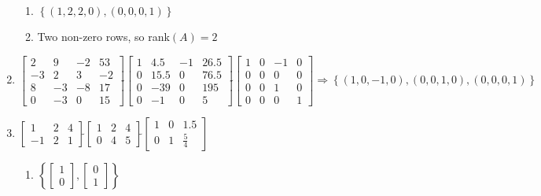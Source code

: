 \documentclass[12pt]{article}
\begin{document}
\begin{enumerate}
    \begin{enumerate}

      \item $\left\{ (1,2,2,0),(0,0,0,1) \right\}$

      \item Two non-zero rows, so rank$(A)=2$

    \end{enumerate}

    \setcounter{enumi}{16}

  \item $\begin{bmatrix} 2 & 9 & -2 & 53\\ -3 & 2 & 3 & -2\\ 8 & -3 & -8 & 17\\ 0 & -3 & 0 & 15 \end{bmatrix}\widetilde{ }\begin{bmatrix} 1 & 4.5 & -1 & 26.5\\ 0 & 15.5 & 0 & 76.5\\ 0 & -39 & 0 & 195\\ 0 & -1 & 0 & 5  \end{bmatrix}\widetilde{ }\begin{bmatrix}1 & 0 & -1 & 0\\ 0 & 0 & 0 & 0\\ 0 & 0 & 1 & 0\\ 0 & 0 & 0 & 1   \end{bmatrix}\Rightarrow\left\{ (1,0,-1,0),(0,0,1,0),(0,0,0,1) \right\}$

    \setcounter{enumi}{22}

  \item $\begin{bmatrix} 1 & 2 & 4\\ -1 & 2 & 1 \end{bmatrix}\widetilde{ }\begin{bmatrix} 1 & 2 & 4\\ 0 & 4 & 5 \end{bmatrix}\widetilde{ }\begin{bmatrix} 1 & 0 & 1.5\\ 0 & 1 & \frac{5}{4}  \end{bmatrix}$

        \begin{enumerate}

          \item $\left\{ \begin{bmatrix} 1\\0 \end{bmatrix},\begin{bmatrix} 0\\ 1\end{bmatrix} \right\}$


\end{enumerate}
\end{enumerate}
\end{document}
